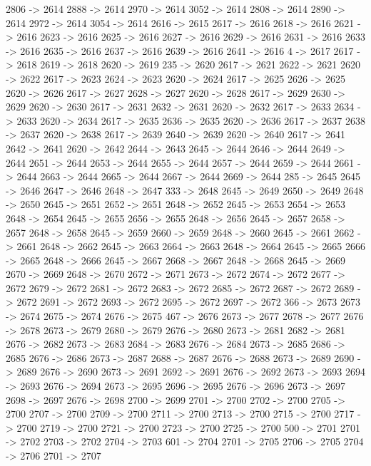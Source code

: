 {	2806 -> 2614
	2888 -> 2614
	2970 -> 2614
	3052 -> 2614
	2808 -> 2614
	2890 -> 2614
	2972 -> 2614
	3054 -> 2614
	2616 -> 2615
	2617 -> 2616
	2618 -> 2616
	2621 -> 2616
	2623 -> 2616
	2625 -> 2616
	2627 -> 2616
	2629 -> 2616
	2631 -> 2616
	2633 -> 2616
	2635 -> 2616
	2637 -> 2616
	2639 -> 2616
	2641 -> 2616
	4 -> 2617
	2617 -> 2618
	2619 -> 2618
	2620 -> 2619
	235 -> 2620
	2617 -> 2621
	2622 -> 2621
	2620 -> 2622
	2617 -> 2623
	2624 -> 2623
	2620 -> 2624
	2617 -> 2625
	2626 -> 2625
	2620 -> 2626
	2617 -> 2627
	2628 -> 2627
	2620 -> 2628
	2617 -> 2629
	2630 -> 2629
	2620 -> 2630
	2617 -> 2631
	2632 -> 2631
	2620 -> 2632
	2617 -> 2633
	2634 -> 2633
	2620 -> 2634
	2617 -> 2635
	2636 -> 2635
	2620 -> 2636
	2617 -> 2637
	2638 -> 2637
	2620 -> 2638
	2617 -> 2639
	2640 -> 2639
	2620 -> 2640
	2617 -> 2641
	2642 -> 2641
	2620 -> 2642
	2644 -> 2643
	2645 -> 2644
	2646 -> 2644
	2649 -> 2644
	2651 -> 2644
	2653 -> 2644
	2655 -> 2644
	2657 -> 2644
	2659 -> 2644
	2661 -> 2644
	2663 -> 2644
	2665 -> 2644
	2667 -> 2644
	2669 -> 2644
	285 -> 2645
	2645 -> 2646
	2647 -> 2646
	2648 -> 2647
	333 -> 2648
	2645 -> 2649
	2650 -> 2649
	2648 -> 2650
	2645 -> 2651
	2652 -> 2651
	2648 -> 2652
	2645 -> 2653
	2654 -> 2653
	2648 -> 2654
	2645 -> 2655
	2656 -> 2655
	2648 -> 2656
	2645 -> 2657
	2658 -> 2657
	2648 -> 2658
	2645 -> 2659
	2660 -> 2659
	2648 -> 2660
	2645 -> 2661
	2662 -> 2661
	2648 -> 2662
	2645 -> 2663
	2664 -> 2663
	2648 -> 2664
	2645 -> 2665
	2666 -> 2665
	2648 -> 2666
	2645 -> 2667
	2668 -> 2667
	2648 -> 2668
	2645 -> 2669
	2670 -> 2669
	2648 -> 2670
	2672 -> 2671
	2673 -> 2672
	2674 -> 2672
	2677 -> 2672
	2679 -> 2672
	2681 -> 2672
	2683 -> 2672
	2685 -> 2672
	2687 -> 2672
	2689 -> 2672
	2691 -> 2672
	2693 -> 2672
	2695 -> 2672
	2697 -> 2672
	366 -> 2673
	2673 -> 2674
	2675 -> 2674
	2676 -> 2675
	467 -> 2676
	2673 -> 2677
	2678 -> 2677
	2676 -> 2678
	2673 -> 2679
	2680 -> 2679
	2676 -> 2680
	2673 -> 2681
	2682 -> 2681
	2676 -> 2682
	2673 -> 2683
	2684 -> 2683
	2676 -> 2684
	2673 -> 2685
	2686 -> 2685
	2676 -> 2686
	2673 -> 2687
	2688 -> 2687
	2676 -> 2688
	2673 -> 2689
	2690 -> 2689
	2676 -> 2690
	2673 -> 2691
	2692 -> 2691
	2676 -> 2692
	2673 -> 2693
	2694 -> 2693
	2676 -> 2694
	2673 -> 2695
	2696 -> 2695
	2676 -> 2696
	2673 -> 2697
	2698 -> 2697
	2676 -> 2698
	2700 -> 2699
	2701 -> 2700
	2702 -> 2700
	2705 -> 2700
	2707 -> 2700
	2709 -> 2700
	2711 -> 2700
	2713 -> 2700
	2715 -> 2700
	2717 -> 2700
	2719 -> 2700
	2721 -> 2700
	2723 -> 2700
	2725 -> 2700
	500 -> 2701
	2701 -> 2702
	2703 -> 2702
	2704 -> 2703
	601 -> 2704
	2701 -> 2705
	2706 -> 2705
	2704 -> 2706
	2701 -> 2707
}
